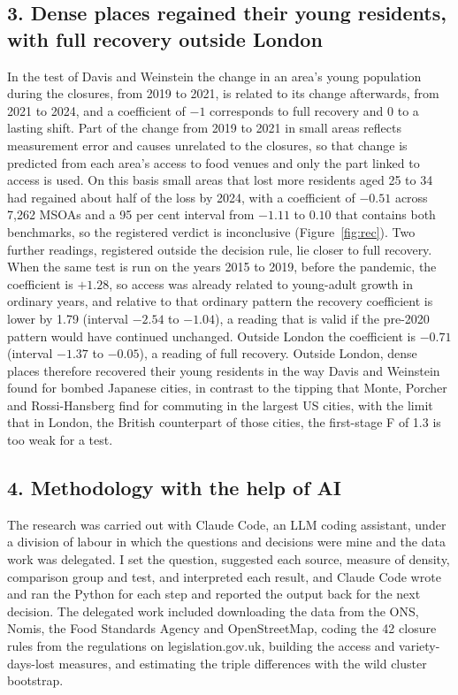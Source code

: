 \documentclass[11pt,a4paper]{article}
\begin{document}
\subsection*{3. Dense places regained their young residents, with full recovery outside London}

In the test of Davis and Weinstein the change in an area's young population during the closures, from 2019 to 2021, is related to its change afterwards, from 2021 to 2024, and a coefficient of $-1$ corresponds to full recovery and 0 to a lasting shift. Part of the change from 2019 to 2021 in small areas reflects measurement error and causes unrelated to the closures, so that change is predicted from each area's access to food venues and only the part linked to access is used. On this basis small areas that lost more residents aged 25 to 34 had regained about half of the loss by 2024, with a coefficient of $-0.51$ across 7,262 MSOAs and a 95 per cent interval from $-1.11$ to $0.10$ that contains both benchmarks, so the registered verdict is inconclusive (Figure~\ref{fig:rec}). Two further readings, registered outside the decision rule, lie closer to full recovery. When the same test is run on the years 2015 to 2019, before the pandemic, the coefficient is $+1.28$, so access was already related to young-adult growth in ordinary years, and relative to that ordinary pattern the recovery coefficient is lower by 1.79 (interval $-2.54$ to $-1.04$), a reading that is valid if the pre-2020 pattern would have continued unchanged. Outside London the coefficient is $-0.71$ (interval $-1.37$ to $-0.05$), a reading of full recovery. Outside London, dense places therefore recovered their young residents in the way Davis and Weinstein found for bombed Japanese cities, in contrast to the tipping that Monte, Porcher and Rossi-Hansberg find for commuting in the largest US cities, with the limit that in London, the British counterpart of those cities, the first-stage F of 1.3 is too weak for a test.

\subsection*{4. Methodology with the help of AI}

The research was carried out with Claude Code, an LLM coding assistant, under a division of labour in which the questions and decisions were mine and the data work was delegated. I set the question, suggested each source, measure of density, comparison group and test, and interpreted each result, and Claude Code wrote and ran the Python for each step and reported the output back for the next decision. The delegated work included downloading the data from the ONS, Nomis, the Food Standards Agency and OpenStreetMap, coding the 42 closure rules from the regulations on legislation.gov.uk, building the access and variety-days-lost measures, and estimating the triple differences with the wild cluster bootstrap.
\end{document}
